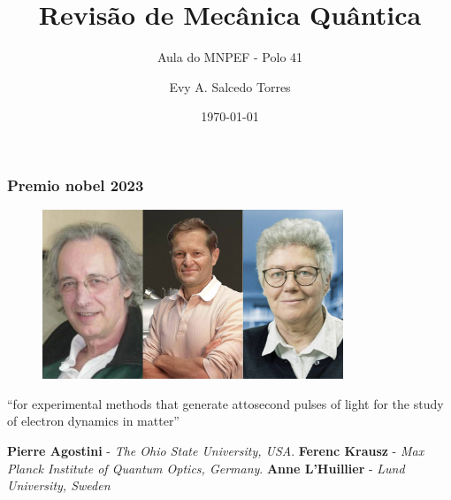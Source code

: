 \documentclass[12pt,brazil]{beamer}
\title{Revisão de Mecânica Quântica}
\subtitle{Aula do MNPEF - Polo 41}
\author{Evy A. Salcedo Torres}
\date{\today}
\begin{document}

\begin{frame}
  \titlepage
\end{frame}


\begin{frame}
  \frametitle{Premio nobel 2023}
  
        \fontsize{9pt}{11pt}\selectfont
  
      \begin{figure}
        \includegraphics[width=9cm]{figuras/fig_n01}
      \end{figure}
      
      ``for experimental methods that generate attosecond pulses of light for the study of electron dynamics in matter''\newline
      
        \fontsize{6pt}{11pt}\selectfont
      \textbf{Pierre Agostini} - \textit{The Ohio State University, USA}.
      \textbf{Ferenc Krausz} - \textit{Max Planck Institute of Quantum Optics, Germany}.
      \textbf{Anne L’Huillier} - \textit{Lund University, Sweden}

\end{frame}

\end{document}
